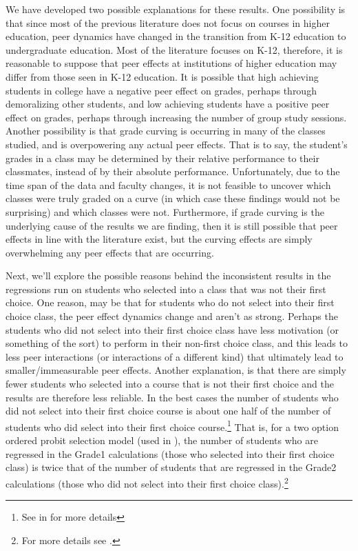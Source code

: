 We have developed two possible explanations for these results. 
One possibility is that since most of the previous literature does not focus on courses in higher education, peer dynamics have changed in the transition from K-12 education to undergraduate education. 
Most of the literature focuses on K-12, therefore, it is reasonable to suppose that peer effects at institutions of higher education may differ from those seen in K-12 education. 
It is possible that high achieving students in college have a negative peer effect on grades, perhaps through demoralizing other students, and low achieving students have a positive peer effect on grades, perhaps through increasing the number of group study sessions. 
Another possibility is that grade curving is occurring in many of the classes studied, and is overpowering any actual peer effects. 
That is to say, the student's grades in a class may be determined by their relative performance to their classmates, instead of by their absolute performance. 
Unfortunately, due to the time span of the data and faculty changes, it is not feasible to uncover which classes were truly graded on a curve (in which case these findings would not be surprising) and which classes were not. 
Furthermore, if grade curving is the underlying cause of the results we are finding, then it is still possible that peer effects in line with the literature exist, but the curving effects are simply overwhelming any peer effects that are occurring. 

Next, we'll explore the possible reasons behind the inconsistent results in the regressions run on students who selected into a class that was not their first choice. 
One reason, may be that for students who do not select into their first choice class, the peer effect dynamics change and aren't as strong. 
Perhaps the students who did not select into their first choice class have less motivation (or something of the sort) to perform in their non-first choice class, and this leads to less peer interactions (or interactions of a different kind) that ultimately lead to smaller/immeasurable peer effects. 
Another explanation, is that there are simply fewer students who selected into a course that is not their first choice and the results are therefore less reliable. 
In the best cases the number of students who did not select into their first choice course is about one half of the number of students who did select into their first choice course.\footnote{See  in  for more details} 
That is, for a two option ordered probit selection model (used in ), the number of students who are regressed in the Grade1 calculations (those who selected into their first choice class) is twice that of the number of students that are regressed in the Grade2 calculations (those who did not select into their first choice class).\footnote{For more details see .} 


